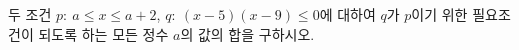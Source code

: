 두 조건 $p:\ a\le x\le a+2$, $q:\ (x-5)(x-9)\le 0$에 대하여 $q$가 $p$이기 위한 필요조건이 되도록 하는 모든 정수 $a$의 값의 합을 구하시오.
